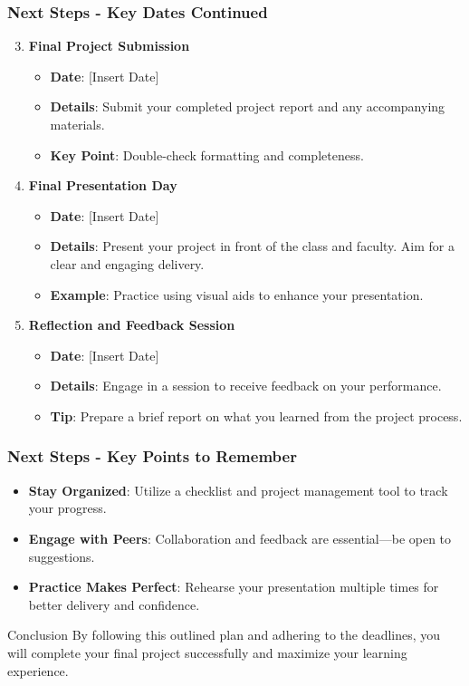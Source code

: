 \documentclass[aspectratio=169]{beamer}
\begin{document}
\begin{frame}[fragile]
    \frametitle{Next Steps - Key Dates Continued}
    \begin{enumerate}
        \setcounter{enumi}{2}
        \item \textbf{Final Project Submission}  
            \begin{itemize}
                \item \textbf{Date}: [Insert Date]
                \item \textbf{Details}: Submit your completed project report and any accompanying materials.
                \item \textbf{Key Point}: Double-check formatting and completeness.
            \end{itemize}
        
        \item \textbf{Final Presentation Day}  
            \begin{itemize}
                \item \textbf{Date}: [Insert Date]
                \item \textbf{Details}: Present your project in front of the class and faculty. Aim for a clear and engaging delivery.
                \item \textbf{Example}: Practice using visual aids to enhance your presentation.
            \end{itemize}
        
        \item \textbf{Reflection and Feedback Session}  
            \begin{itemize}
                \item \textbf{Date}: [Insert Date]
                \item \textbf{Details}: Engage in a session to receive feedback on your performance.
                \item \textbf{Tip}: Prepare a brief report on what you learned from the project process.
            \end{itemize}
    \end{enumerate}
\end{frame}

\begin{frame}[fragile]
    \frametitle{Next Steps - Key Points to Remember}
    \begin{itemize}
        \item \textbf{Stay Organized}: Utilize a checklist and project management tool to track your progress.
        \item \textbf{Engage with Peers}: Collaboration and feedback are essential—be open to suggestions.
        \item \textbf{Practice Makes Perfect}: Rehearse your presentation multiple times for better delivery and confidence.
    \end{itemize}

    \begin{block}{Conclusion}
        By following this outlined plan and adhering to the deadlines, you will complete your final project successfully and maximize your learning experience.
    \end{block}
\end{frame}
\end{document}
